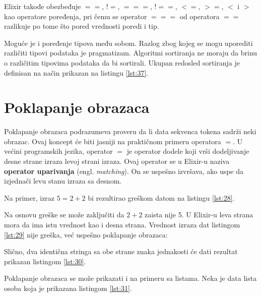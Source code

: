 \documentclass[12pt,oneside]{memoir}
\begin{document}
Elixir takođe obezbeđuje $==$, ${!}{=}$, $===$, ${!}{=}{=}$, $<=$, $>=$, $<$ i $>$ kao operatore poređenja, pri čemu se operator $===$ od operatora $==$ razlikuje po tome što pored vrednosti poredi i tip.

Moguće je i poređenje tipova među sobom. Razlog zbog kojeg se mogu uporediti različiti tipovi podataka je pragmatizam. Algoritmi sortiranja ne moraju da brinu o različitim tipovima podataka da bi sortirali. Ukupan redosled sortiranja je definisan na način prikazan na listingu \ref{lst:37}.



\section{Poklapanje obrazaca}

Poklapanje obrazaca podrazumeva proveru da li data sekvenca tokena sadrži neki obrazac. Ovaj koncept će biti jasniji na praktičnom primeru operatora $=$. U većini programskih jezika, operator $=$ je operator dodele koji vrši dodeljivanje desne strane izraza levoj strani izraza. Ovaj operator se u Elixir-u naziva \textbf{operator uparivanja} (engl. \textit{matching}). On se uspešno izvršava, ako uspe da izjednači levu stanu izraza sa desnom.

Na primer, izraz $5 = 2 + 2$ bi rezultirao greškom datom na listingu \ref{lst:28}.



Na osnovu greške se može zaključiti da $2 + 2$ zaista nije 5. U Elixir-u leva strana mora da ima istu vrednost kao i desna strana. Vrednost izraza dat listingom \ref{lst:29} nije greška, već uspešno poklapanje obrazaca:



Slično, dva identična stringa sa obe strane znaka jednakosti će dati rezultat prikazan listingom \ref{lst:30}.



Poklapanje obrazaca se može prikazati i na primeru sa listama. Neka je data lista osoba koja je prikazana listingom \ref{lst:31}.


\end{document}
